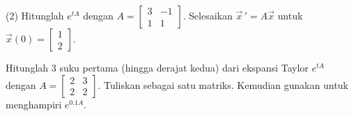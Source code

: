 \begin{exercise}
\pagebreak[2]
\leavevmode
\begin{tasks}(2)
\task
Hitunglah
$e^{tA}$ dengan
$A=\left[ \begin{smallmatrix}
3 & -1 \\
1 & 1 
\end{smallmatrix}\right]$.
\task
Selesaikan $\vec{x}\,' = A \vec{x}$
untuk $\vec{x}(0) =
\left[ \begin{smallmatrix}
1 \\ 2
\end{smallmatrix}\right]$.
\end{tasks}
\end{exercise}

\begin{exercise}
Hitunglah 3 suku pertama (hingga derajat kedua) dari ekspansi Taylor
$e^{tA}$ dengan
$A=\left[ \begin{smallmatrix}
2 & 3 \\
2 & 2 
\end{smallmatrix}\right]$.  Tuliskan sebagai satu matriks.
Kemudian gunakan untuk menghampiri $e^{0.1A}$.
\end{exercise}

